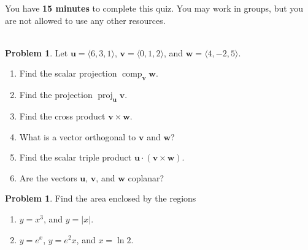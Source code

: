 \documentclass[12pt]{article}
\theoremstyle{plain}
\theoremstyle{definition}
\newtheorem{problem}[exercise]{Problem}
\theoremstyle{remark}
\DeclareMathOperator{\proj}{proj}
\DeclareMathOperator{\comp}{comp}
\newcommand{\bfu}{\mathbf{u}}
\newcommand{\bfv}{\mathbf{v}}
\newcommand{\bfw}{\mathbf{w}}
\begin{document}
\author{TA: \href{mailto:\authoremail}{\documentauthor}}
\title{\documenttitle}
\date{\today}
\maketitle

You have \textbf{15 minutes} to complete this quiz. You may work in groups,
but you are not allowed to use any other resources.
\\\\
\begin{problem}
\label{prob:1}
Let $\bfu=\langle 6,3,1\rangle$, $\bfv=\langle 0,1,2\rangle$, and
$\bfw=\langle 4,-2,5\rangle$.
\begin{enumerate}[label=(\roman*)]
\item \label{prob:1-i}Find the scalar projection $\comp_{\bfv}\bfw$.
\item \label{prob:1-ii} Find the projection $\proj_{\bfu}\bfv$.
\item \label{prob:1-iii} Find the cross product $\bfv\times\bfw$.
\item \label{prob:1-iv} What is a vector orthogonal to $\bfv$ and $\bfw$?
\item \label{prob:1-v}Find the scalar triple product $\bfu\cdot(\bfv\times\bfw)$.
\item \label{prob:1-vi} Are the vectors $\bfu$, $\bfv$, and $\bfw$ coplanar?
\end{enumerate}
\end{problem}
\bigskip
\begin{problem}%
\label{prob:2}
Find the area enclosed by the regions
\begin{enumerate}[label=(\roman*)]
\item \label{prob:2-i} $y=x^3$, and $y=|x|$.
\item \label{prob:2-ii} $y=e^x$, $y=e^2x$, and $x=\ln 2$.
\end{enumerate}
\end{problem}
\newpage
\end{document}

